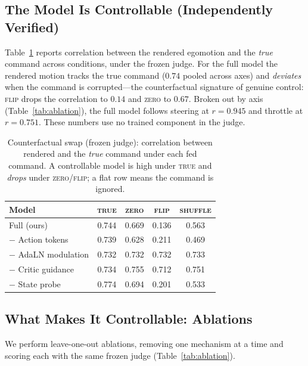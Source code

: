 \documentclass[letterpaper]{article} %
\begin{document}
\subsection{The Model Is Controllable (Independently Verified)}
Table~\ref{tab:cond} reports correlation between the rendered egomotion and the \emph{true} command across conditions, under the frozen judge. For the full model the rendered motion tracks the true command ($0.74$ pooled across axes) and \emph{deviates} when the command is corrupted---the counterfactual signature of genuine control: \textsc{flip} drops the correlation to $0.14$ and \textsc{zero} to $0.67$. Broken out by axis (Table~\ref{tab:ablation}), the full model follows steering at $r{=}0.945$ and throttle at $r{=}0.751$. These numbers use no trained component in the judge.

\begin{table}[t]
\centering
\begin{tabular}{lcccc}
\toprule
Model & \textsc{true} & \textsc{zero} & \textsc{flip} & \textsc{shuffle} \\
\midrule
Full (ours)            & 0.744 & 0.669 & 0.136 & 0.563 \\
$-$ Action tokens      & 0.739 & 0.628 & 0.211 & 0.469 \\
$-$ AdaLN modulation   & 0.732 & 0.732 & 0.732 & 0.733 \\
$-$ Critic guidance    & 0.734 & 0.755 & 0.712 & 0.751 \\
$-$ State probe        & 0.774 & 0.694 & 0.201 & 0.533 \\
\bottomrule
\end{tabular}
\caption{Counterfactual swap (frozen judge): correlation between rendered and the \emph{true} command under each fed command. A controllable model is high under \textsc{true} and \emph{drops} under \textsc{zero}/\textsc{flip}; a flat row means the command is ignored.}
\label{tab:cond}
\end{table}

\subsection{What Makes It Controllable: Ablations}
We perform leave-one-out ablations, removing one mechanism at a time and scoring each with the same frozen judge (Table~\ref{tab:ablation}).
\end{document}
